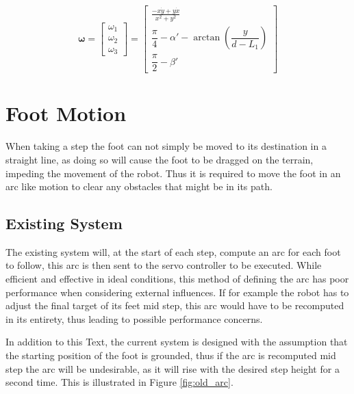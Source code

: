     \begin{equation}\label{eq:rate}
        \boldsymbol{\omega} =
                            \begin{bmatrix}
                                \omega_1\\
                                \omega_2\\
                                \omega_3
                            \end{bmatrix}
                            =
                            \begin{bmatrix}
                                \displaystyle \frac{- x\dot{y} + y \dot{x}}{x^2 + y^2}\\[0.5cm]
                                \dfrac{\pi}{4} - \alpha' - \arctan{\left(\dfrac{y}{d-L_1}\right)}\\[0.5cm]
                                \dfrac{\pi}{2} - \beta'
                            \end{bmatrix}
    \end{equation}

\newpage
\section{Foot Motion} \label{sec:arc_generation}
    When taking a step the foot can not simply be moved to its destination in a straight line, as doing so will cause the foot to be dragged on the terrain,
    impeding the movement of the robot. Thus it is required to move the foot in an arc like motion to clear any obstacles that might be in its path.

    \subsection{Existing System}
        The existing system will, at the start of each step, compute an arc for each foot to follow, this arc is then sent to the servo controller
        to be executed. While efficient and effective in ideal conditions, this method of defining the arc has poor performance when considering external
        influences. If for example the robot has to adjust the final target of its feet mid step, this arc would have to be recomputed in its entirety,
        thus leading to possible performance concerns.

        In addition to this Text, the current system is designed with the assumption that the starting position of the foot is grounded, thus if the arc is recomputed
        mid step the arc will be undesirable, as it will rise with the desired step height for a second time. This is illustrated in Figure \ref{fig:old_arc}.

